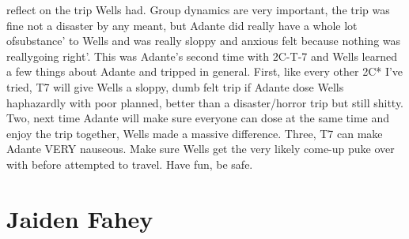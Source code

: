 \documentclass[12pt]{book}
\begin{document}
reflect on the trip Wells had. Group dynamics are very important, the trip was fine not a disaster by any meant, but Adante did really have a whole lot ofsubstance' to Wells and was really sloppy and anxious felt because nothing was reallygoing right'. This was Adante's second time with 2C-T-7 and Wells learned a few things about Adante and tripped in general. First, like every other 2C* I've tried, T7 will give Wells a sloppy, dumb felt trip if Adante dose Wells haphazardly with poor planned, better than a disaster/horror trip but still shitty. Two, next time Adante will make sure everyone can dose at the same time and enjoy the trip together, Wells made a massive difference. Three, T7 can make Adante VERY nauseous. Make sure Wells get the very likely come-up puke over with before attempted to travel. Have fun, be safe.



\chapter{Jaiden Fahey}
\end{document}
